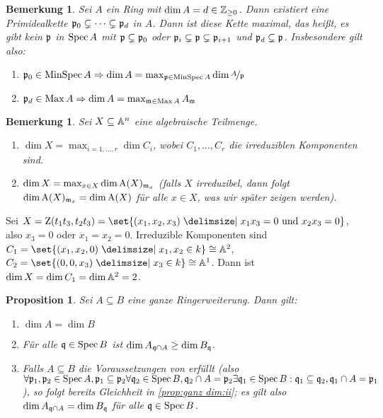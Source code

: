 \documentclass[12pt,a4paper]{scrartcl}
\theoremstyle{cplain}
\newtheorem{prop}[thmcounter]{Proposition}
\theoremstyle{cdef}
\newtheorem{beme}[thmcounter]{Bemerkung}
\begin{document}
\begin{beme}
	Sei $A$ ein Ring mit $\dim A = d \in\mathbb Z_{\ge 0}$. Dann existiert eine Primidealkette $\mathfrak{p}_0\subsetneq \dots \subsetneq \mathfrak{p}_d$ in $A$. Dann ist diese Kette maximal, das heißt, es gibt kein $\mathfrak{p} $ in $\operatorname{Spec} A$ mit $\mathfrak{p}\subsetneq \mathfrak{p}_0$ oder $\mathfrak{p}_i\subsetneq \mathfrak{p}\subsetneq \mathfrak{p}_{i+1}$ und $\mathfrak{p}_d\subsetneq \mathfrak{p}$. Insbesondere gilt also:
	\begin{enumerate}
		\item $\mathfrak{p}_0\in\operatorname{MinSpec} A\Rightarrow \dim A= \max_{\mathfrak{p}\in \operatorname{MinSpec} A}\dim \nicefrac{A}{\mathfrak{p}}$
		\item $\mathfrak{p}_d\in \operatorname{Max} A\Rightarrow \dim A = \max_{\mathfrak{m}\in \operatorname{Max} A} A_{\mathfrak{m}}$
	\end{enumerate}
\end{beme}
\begin{beme}
	Sei $X\subseteq \mathbb A^n$ eine algebraische Teilmenge.
	\begin{enumerate}
		\item $\dim X = \max_{i = 1,\dots, r} \dim C_i$, wobei $C_1,\dots, C_r$ die irreduziblen Komponenten sind.
		\item $\dim X = \max_{x\in X}\dim \operatorname{A}(X)_{\mathfrak{m}_x}$ (falls $X$ irreduzibel, dann folgt $\dim \operatorname{A}(X)_{\mathfrak{m}_x} = \dim \operatorname{A}(X)$ für alle $x \in X$, was wir später zeigen werden).
	\end{enumerate}
\end{beme}
\begin{bsp}
	Sei $X  = \Z(t_1t_3, t_2t_3) = \set{(x_1,x_2,x_3)\given x_1x_3 = 0\text{ und } x_2x_3 = 0}$, also $x_3 = 0$ oder $x_1 = x_2 = 0$.
	Irreduzible Komponenten sind $C_1 = \set{(x_1,x_2, 0)\given x_1,x_2 \in k}\cong \IA^2$, $C_2 = \set{(0,0,x_3)\given x_3\in k}\cong \IA^1$. Dann ist $\dim X = \dim C_1 = \dim \mathbb A^2 = 2$.
\end{bsp}
\begin{prop} \label{prop:ganz dim}
	Sei $A\subseteq B$ eine ganze Ringerweiterung. Dann gilt:
	\begin{enumerate}
		\item $\dim A = \dim B$ \label{prop:ganz dim:i}
		\item Für alle $\mathfrak{q}\in\operatorname{Spec} B$ ist $\dim A_{\mathfrak{q}\cap A}\ge \dim B_{\mathfrak{q}}$. \label{prop:ganz dim:ii}
		\item Falls $A\subseteq B$ die Voraussetzungen von  erfüllt (also $\forall \mathfrak{p}_1, \mathfrak{p}_2\in \operatorname{Spec} A, \mathfrak{p}_1\subseteq \mathfrak{p}_2\forall \mathfrak{q}_2\in\operatorname{Spec} B, \mathfrak{q}_2\cap A = \mathfrak{p}_2\exists \mathfrak{q}_1\in\operatorname{Spec} B: \mathfrak{q}_1\subseteq \mathfrak{q}_2, \mathfrak{q}_1\cap A = \mathfrak{p}_1$), so folgt bereits Gleichheit in \ref{prop:ganz dim:ii}; es gilt also $\dim A_{\mathfrak{q}\cap A} =\dim B_{\mathfrak{q}}$ für alle $\mathfrak{q} \in \operatorname{Spec} B$. \label{prop:ganz dim:iii}
	\end{enumerate}
\end{prop}
\end{document}
